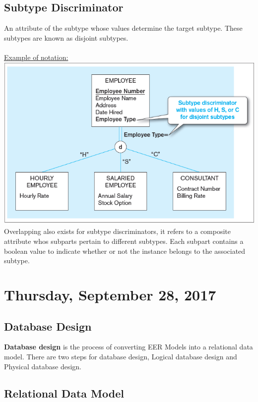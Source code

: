 \documentclass[12pt]{article}
\begin{document}
\subsection{Subtype Discriminator}

An attribute of the subtype whose values determine the target subtype. These subtypes are known as disjoint subtypes.\\
\\
\underline{Example of notation:}\\
\includegraphics[scale=0.5]{lec3-8}\\

Overlapping also exists for subtype discriminators, it refers to a composite attribute whos subparts pertain to different subtypes. Each subpart contains a boolean value to indicate whether or not the instance belongs to the associated subtype.

\newpage

\section{Thursday, September 28, 2017}

\subsection{Database Design}

\textbf{Database design} is the process of converting EER Models into a relational data model. There are two steps for database design, Logical database design and Physical database design.

\subsection{Relational Data Model}
\end{document}
